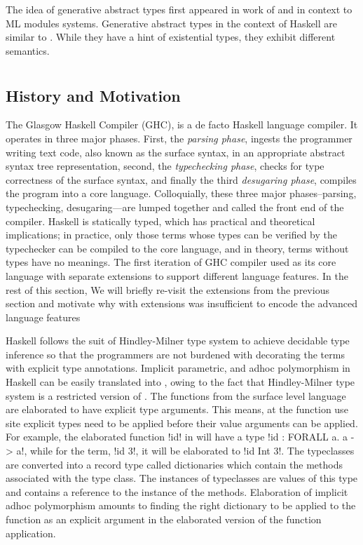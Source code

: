 \documentclass[screen,nonacm]{acmart}
\begin{document}
The idea of generative abstract types first appeared in work of
\citet{leroy_applicative_1995} and \citet{milner_definition_1997}
in context to ML modules systems. Generative abstract types in the
context of Haskell are similar to \cite{montagu_modeling_2009}.
While they have a hint of existential types, they exhibit different
semantics.

\label{part:II}
\section{\SFC}\label{sec:sfc} %
\subsection{History and Motivation}
The Glasgow Haskell Compiler (GHC)\cite{ghc_2020}, is a de facto
Haskell language\cite{haskell_2010} compiler. It operates in
three major phases. First, the \emph{parsing phase}, ingests the
programmer writing text code, also known as
the surface syntax, in an appropriate abstract syntax tree
representation, second, the \emph{typechecking phase},
checks for type correctness of the surface syntax, and finally the
third \emph{desugaring phase}, compiles the program into a core
language. Colloquially, these three major phases--parsing,
typechecking, desugaring---are lumped together and called
the front end of the compiler. Haskell is statically typed,
which has practical and theoretical implications;
in practice, only those terms whose types can be verified by the
typechecker can be compiled to the core language, and in theory,
terms without types have no meanings. The first iteration of GHC
compiler used \SF as its core language with separate extensions to
support different language features. In the rest of this section, We will
briefly re-visit the extensions  from the previous section and
motivate why \SF with extensions was insufficient to encode the
advanced language features

Haskell follows the suit of Hindley-Milner type
system\cite{milner_theory_1978} to achieve decidable type inference so
that the programmers are not burdened with decorating the terms with
explicit type annotations.
Implicit parametric\cite{reynolds_user-defined_1978}, and adhoc
polymorphism\cite{hall_type_1994} in Haskell can be easily
translated into \SF, owing to the fact that Hindley-Milner type
system is a restricted version of \SF. The functions from the surface
level language are elaborated to have explicit type arguments. This
means, at the function use site explicit types need to be applied
before their value arguments can be applied.
For example, the elaborated function !id! in \SF will have a type
!id : FORALL a. a -> a!, while for the term, !id 3!, it will be elaborated
to !id Int 3!. The typeclasses are converted into a record type called
dictionaries\cite{wadler_polymorphism_1989} which contain the methods
associated with the type class. The instances of typeclasses are
values of this type and contains a reference to the instance of the
methods. Elaboration of implicit adhoc polymorphism amounts to finding
the right dictionary to be applied to the function as an explicit
argument in the elaborated version of the function application.
\end{document}
